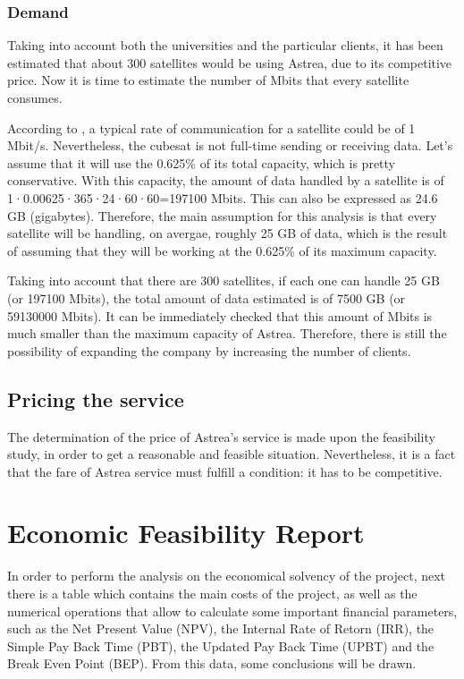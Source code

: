 \subsubsection{Demand}


Taking into account both the universities and the particular clients, it has been estimated that about 300 satellites would be using Astrea, due to its competitive price. Now it is time to estimate the number of Mbits that every satellite consumes.

According to \cite{GomSpace2016}, a typical rate of communication for a satellite could be of 1 Mbit/s. Nevertheless, the cubesat is not full-time sending or receiving data. Let's assume that it will use the 0.625\% of its total capacity, which is pretty conservative. With this capacity, the amount of data handled by a satellite is of 1·0.00625·365·24·60·60=197100 Mbits. This can also be expressed as 24.6 GB (gigabytes). Therefore, the main assumption for this analysis is that every satellite will be handling, on avergae, roughly 25 GB of data, which is the result of assuming that they will be working at the 0.625\% of its maximum capacity. 

Taking into account that there are 300 satellites, if each one can handle 25 GB (or 197100 Mbits), the total amount of data estimated is of 7500 GB (or 59130000 Mbits). It can be immediately checked that this amount of Mbits is much smaller than the maximum capacity of Astrea. Therefore, there is still the possibility of expanding the company by increasing the number of clients.  

\subsection{Pricing the service}
The determination of the price of Astrea's service is made upon the feasibility study, in order to get a reasonable and feasible situation. Nevertheless, it is a fact that the fare of Astrea service must fulfill a condition: it has to be competitive. 


\section{Economic Feasibility Report}

In order to perform the analysis on the economical solvency of the project, next there is a table which contains the main costs of the project, as well as the numerical operations that allow to calculate some important financial parameters, such as the Net Present Value (NPV), the Internal Rate of Retorn (IRR), the Simple Pay Back Time (PBT), the Updated Pay Back Time (UPBT) and the Break Even Point (BEP). From this data, some conclusions will be drawn.

